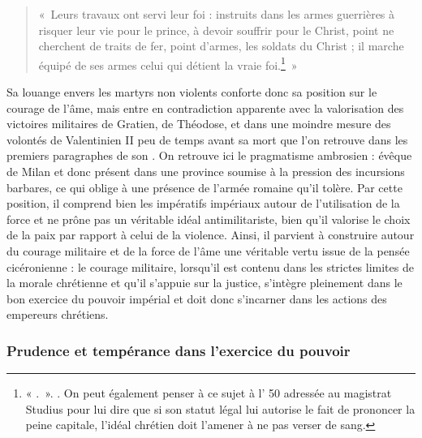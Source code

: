 \bigskip

\begin{quote}
«~Leurs travaux ont servi leur foi : instruits dans les armes guerrières à risquer leur vie pour le prince, à devoir souffrir pour le Christ, point ne cherchent de traits de fer, point d'armes, les soldats du Christ ; il marche équipé de ses armes celui qui détient la vraie foi.\footnote{« .~». \cite[Hymne 10, strophes 5-6]{ambroise_hymnes}. On peut également penser à ce sujet à l' 50 adressée au magistrat Studius pour lui dire que si son statut légal lui autorise le fait de prononcer la peine capitale, l'idéal chrétien doit l'amener à ne pas verser de sang.}~»
\end{quote}

\bigskip

Sa louange envers les martyrs non violents conforte donc sa position sur le courage de l'âme, mais entre en contradiction apparente avec la valorisation des victoires militaires de Gratien, de Théodose, et dans une moindre mesure des volontés de Valentinien II peu de temps avant sa mort que l'on retrouve dans les premiers paragraphes de son . On retrouve ici le pragmatisme ambrosien : évêque de Milan et donc présent dans une province soumise à la pression des incursions barbares, ce qui oblige à une présence de l'armée romaine qu'il tolère. Par cette position, il comprend bien les impératifs impériaux autour de l'utilisation de la force et ne prône pas un véritable idéal antimilitariste, bien qu'il valorise le choix de la paix par rapport à celui de la violence. Ainsi, il parvient à construire autour du courage militaire et de la force de l'âme une véritable vertu issue de la pensée cicéronienne : le courage militaire, lorsqu'il est contenu dans les strictes limites de la morale chrétienne et qu'il s'appuie sur la justice, s'intègre pleinement dans le bon exercice du pouvoir impérial et doit donc s'incarner dans les actions des empereurs chrétiens.

\bigskip

\subsubsection{Prudence et tempérance dans l’exercice du pouvoir}

